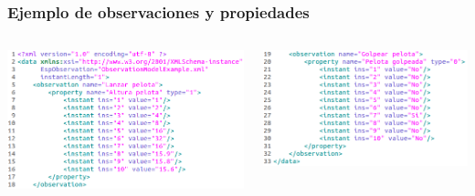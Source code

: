 \begin{frame}
	\frametitle{Ejemplo de observaciones y propiedades}
	
	\begin{columns}[T] %
		\begin{column}[T]{5cm} %
			\begin{center}
				\includegraphics[width=1.1\linewidth]{./Figures/Datos1.png}
			\end{center}

		\end{column}
		\begin{column}[T]{5cm} %
			\begin{center}
				\includegraphics[width=1.1\linewidth]{./Figures/Datos2.png}
			\end{center}
		\end{column}
	\end{columns}
\end{frame}
